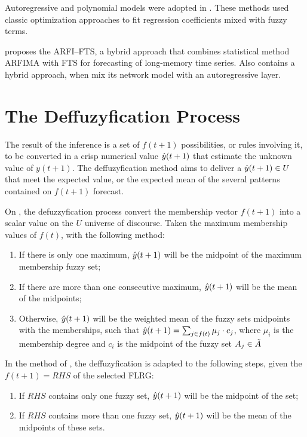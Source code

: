 Autoregressive and polynomial models were adopted in \cite{Chang1997, Tseng1999, Askari2015, Talarposhti2016a}. These methods used classic optimization approaches to fit regression coefficients mixed with fuzzy terms.

\cite{JavedaniSadaei2016c} proposes the ARFI–FTS, a hybrid approach that combines statistical method ARFIMA with FTS for forecasting of long-memory time series. Also \cite{Bas2015} contains a hybrid approach, when mix its network model with an autoregressive layer.


%
\section{The Deffuzyfication Process}
\label{sec:fts_defuzzyfication}

The result of the inference is a set of $f(t+1)$ possibilities, or rules involving it, to be converted in a crisp numerical value $\hat{y}(t+1)$ that estimate the unknown value of $y(t+1)$. The deffuzyfication method aims to deliver a $\hat{y}(t+1) \in U$ that meet the expected value, or the expected mean of the several patterns contained on $f(t+1)$ forecast.

On \cite{song1993fuzzy}, the defuzzyfication process convert the membership vector $f(t+1)$ into a scalar value on the $U$ universe of discourse. Taken the maximum membership values of $f(t)$, with the following method:

\begin{enumerate}
\item If there is only one maximum, $\hat{y}(t+1)$ will be the midpoint of the maximum membership fuzzy set;
\item If there are more than one consecutive maximum, $\hat{y}(t+1)$ will be the mean of the midpoints;
\item Otherwise, $\hat{y}(t+1)$ will be the weighted mean of the fuzzy sets midpoints with the memberships, such that $\hat{y}(t+1) = \sum_{j \in f(t)} \mu_j\cdot c_j$, where $\mu_i$ is the membership degree and $c_i$ is the midpoint of the fuzzy set $A_j \in \tilde{A}$ 
\end{enumerate}

In the method of \cite{chen1996forecasting}, the deffuzyfication is adapted to the following steps, given the $f(t+1) = RHS$ of the selected FLRG:

\begin{enumerate}
\item If $RHS$ contains only one fuzzy set, $\hat{y}(t+1)$ will be the midpoint of the set;
\item If $RHS$ contains more than one fuzzy set, $\hat{y}(t+1)$ will be the mean of the midpoints of these sets.
\end{enumerate}

